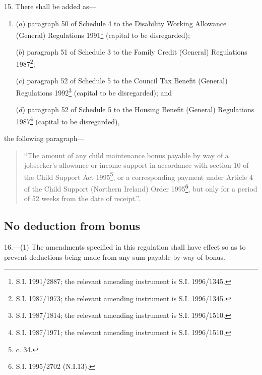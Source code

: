 \documentclass[12pt,a4paper]{article}
\begin{document}
15.  There shall be added as—
\begin{enumerate}\item[]
($a$) 
paragraph 50  %
of Schedule 4 to the Disability Working Allowance (General) Regulations 1991\footnote{\frenchspacing S.I. 1991/2887; the relevant amending instrument is S.I. 1996/1345.} (capital to be disregarded);

($b$) 
paragraph 51  %
of Schedule 3 to the Family Credit (General) Regulations 1987\footnote{\frenchspacing S.I. 1987/1973; the relevant amending instrument is S.I. 1996/1345.};

($c$) 
paragraph 52  %
of Schedule 5 to the Council Tax Benefit (General) Regulations 1992\footnote{\frenchspacing S.I. 1987/1814; the relevant amending instrument is S.I. 1996/1510.} (capital to be disregarded); and

($d$) 
paragraph 52  %
of Schedule 5 to the Housing Benefit (General) Regulations 1987\footnote{\frenchspacing S.I. 1987/1971; the relevant amending instrument is S.I. 1996/1510.} (capital to be disregarded),
\end{enumerate}
the following paragraph—
\begin{quotation}
“The amount of any child maintenance bonus payable by way of a jobseeker’s allowance or income support in accordance with section 10 of the Child Support Act 1995\footnote{ c. 34.}, or a corresponding payment under Article 4 of the Child Support (Northern Ireland) Order 1995\footnote{\frenchspacing S.I. 1995/2702 (N.I.13).}, but only for a period of 52 weeks from the date of receipt.”.
\end{quotation}


\subsection[16. No deduction from bonus]{No deduction from bonus}

16.—(1) The amendments specified in this regulation shall have effect so as to prevent deductions being made from any sum payable by way of bonus.
\end{document}
